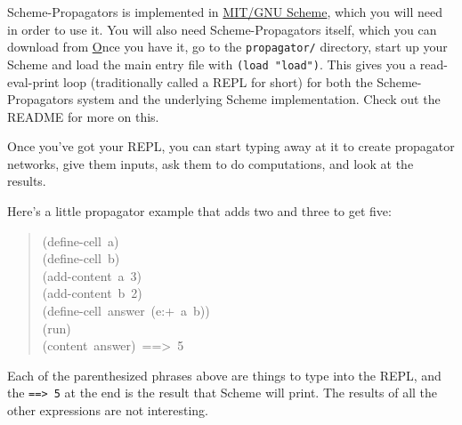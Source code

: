 \documentclass[12pt,letterpaper,english]{article}
\begin{document}
Scheme-Propagators is implemented in \href{http://www.gnu.org/software/mit-scheme/}{MIT/GNU Scheme}, which you will
need in order to use it.  You will also need Scheme-Propagators
itself, which you can download from
\href{http://groups.csail.mit.edu/mac/users/gjs/propagators/propagator.tar}
Once you
have it, go to the \texttt{propagator/} directory, start up your Scheme and
load the main entry file with \texttt{(load "load")}.  This gives you a
read-eval-print loop (traditionally called a REPL for short) for both
the Scheme-Propagators system and the underlying Scheme
implementation.  Check out the README for more on this.

Once you've got your REPL, you can start typing away at it to create
propagator networks, give them inputs, ask them to do computations,
and look at the results.

Here's a little propagator example that adds two and three to get
five:
\begin{quote}{\ttfamily \raggedright \noindent
(define-cell~a)~\\
(define-cell~b)~\\
(add-content~a~3)~\\
(add-content~b~2)~\\
(define-cell~answer~(e:+~a~b))~\\
(run)~\\
(content~answer)~==>~5
}\end{quote}

Each of the parenthesized phrases above are things to type into the
REPL, and the \texttt{==> 5} at the end is the result that Scheme will
print.  The results of all the other expressions are not interesting.
\end{document}
